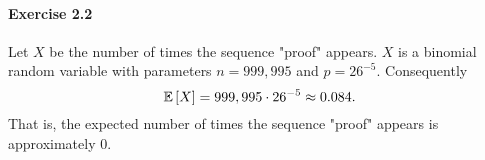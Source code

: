 \paragraph{Exercise 2.2} Let $X$ be the number of times the sequence "proof"
appears. $X$ is a binomial random variable with parameters $n = 999,995$ and
$p = 26^{-5}$. Consequently
\[
  \mathbb{E}\left[ X \right] = 999,995 \cdot 26^{-5} \approx 0.084.
\]
That is, the expected number of times the sequence "proof" appears is
approximately 0.
